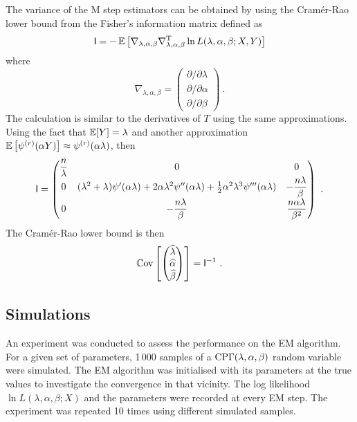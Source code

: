The variance of the M step estimators can be obtained by using the Cram\'er-Rao lower bound \citep{rao1945information, cramer1946mathematical} from the Fisher's information matrix defined as
\begin{equation}
  \mathsf{I} = -\operatorname{\mathbb{E}}\left[
    \nabla_{\lambda,\alpha,\beta}\nabla_{\lambda,\alpha,\beta}^\textup{T} \ln L(\lambda,\alpha,\beta;X,Y)
  \right]
\end{equation}
where
\begin{equation}
  \nabla_{\lambda, \alpha,\beta}=
  \begin{pmatrix}
    {\partial}/{\partial \lambda}
    \\
    {\partial}/{\partial \alpha}
    \\
    {\partial}/{\partial \beta}
  \end{pmatrix}
  \ .
\end{equation}
The calculation is similar to the derivatives of $T$ using the same approximations. Using the fact that $\operatorname{\mathbb{E}}[Y]=\lambda$ and another approximation $\operatorname{\mathbb{E}}\left[\psi^{(r)}(\alpha Y)\right]\approx\psi^{(r)}(\alpha \lambda)$, then
\begin{equation}
  \mathsf{I}=
  \begin{pmatrix}
    \dfrac{n}{\lambda} & 0 & 0 \\
    0 & (\lambda^2+\lambda)\psi'(\alpha\lambda)+2\alpha\lambda^2\psi''(\alpha\lambda)+\frac{1}{2}\alpha^2\lambda^3\psi'''(\alpha\lambda) & -\dfrac{n\lambda}{\beta}\\
    0 & -\dfrac{n\lambda}{\beta} & \dfrac{n\alpha\lambda}{\beta^2}
  \end{pmatrix}
  \ .
\end{equation}
The Cram\'er-Rao lower bound is then
\begin{equation}
  \operatorname{\mathbb{C}ov}\left[
    \begin{pmatrix}
      \widehat{\lambda}\\\widehat{\alpha}\\\widehat{\beta}
    \end{pmatrix}
  \right]
  =
  \mathsf{I}^{-1}
  \ .
\end{equation}

\subsection{Simulations}

An experiment was conducted to assess the performance on the EM algorithm. For a given set of parameters, 1\,000 samples of a $\operatorname{CP\Gamma}(\lambda,\alpha,\beta)$ random variable were simulated. The EM algorithm was initialised with its parameters at the true values to investigate the convergence in that vicinity. The log likelihood $\ln L(\lambda,\alpha,\beta;X)$ and the parameters were recorded at every EM step. The experiment was repeated 10 times using different simulated samples.

